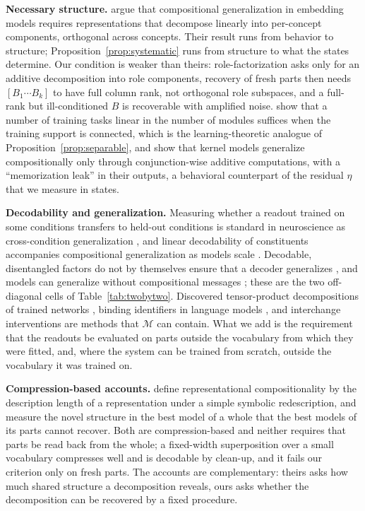\documentclass[10pt]{article}
\theoremstyle{plain}
\theoremstyle{remark}
\newcommand{\M}{\mathcal{M}}
\begin{document}
\textbf{Necessary structure.} \citet{uselis2026} argue that compositional generalization in embedding models requires representations that decompose linearly into per-concept components, orthogonal across concepts. Their result runs from behavior to structure; Proposition~\ref{prop:systematic} runs from structure to what the states determine. Our condition is weaker than theirs: role-factorization asks only for an additive decomposition into role components, recovery of fresh parts then needs $[B_1 \cdots B_k]$ to have full column rank, not orthogonal role subspaces, and a full-rank but ill-conditioned $B$ is recoverable with amplified noise. \citet{schug2024} show that a number of training tasks linear in the number of modules suffices when the training support is connected, which is the learning-theoretic analogue of Proposition~\ref{prop:separable}, and \citet{lippl2025} show that kernel models generalize compositionally only through conjunction-wise additive computations, with a ``memorization leak'' in their outputs, a behavioral counterpart of the residual $\eta$ that we measure in states.

\textbf{Decodability and generalization.} Measuring whether a readout trained on some conditions transfers to held-out conditions is standard in neuroscience as cross-condition generalization \citep{bernardi2020,ito2022}, and linear decodability of constituents accompanies compositional generalization as models scale \citep{redhardt2025}. Decodable, disentangled factors do not by themselves ensure that a decoder generalizes \citep{montero2021,schott2022}, and models can generalize without compositional messages \citep{chaabouni2020}; these are the two off-diagonal cells of Table~\ref{tab:twobytwo}. Discovered tensor-product decompositions of trained networks \citep{mccoy2019,soulos2020}, binding identifiers in language models \citep{feng2024}, and interchange interventions \citep{geiger2021,geiger2024das} are methods that $\M$ can contain. What we add is the requirement that the readouts be evaluated on parts outside the vocabulary from which they were fitted, and, where the system can be trained from scratch, outside the vocabulary it was trained on.

\textbf{Compression-based accounts.} \citet{elmoznino2024} define representational compositionality by the description length of a representation under a simple symbolic redescription, and \citet{elmoznino2026} measure the novel structure in the best model of a whole that the best models of its parts cannot recover. Both are compression-based and neither requires that parts be read back from the whole; a fixed-width superposition over a small vocabulary compresses well and is decodable by clean-up, and it fails our criterion only on fresh parts. The accounts are complementary: theirs asks how much shared structure a decomposition reveals, ours asks whether the decomposition can be recovered by a fixed procedure.
\end{document}
